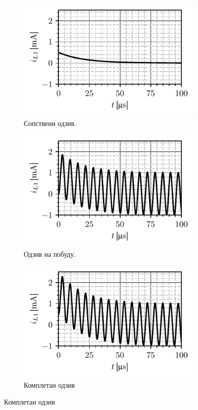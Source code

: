 \begin{figure}[b!]
    \hspace*{0pt}\hfill
    \begin{subfigure}[t]{0.45\textwidth}
        \centering
        \includegraphics[scale=1]{fig/vrste_rl_1.pdf}
        \caption{Сопствени одзив.}
    \end{subfigure}
    \hspace*{0pt}\hfill
    \begin{subfigure}[t]{0.45\textwidth}
        \centering
        \includegraphics[scale=1]{fig/vrste_rl_2.pdf}
        \caption{Одзив на побуду.}
    \end{subfigure}
    \hfill
    \hspace*{0pt}

    \hspace*{0pt}\hfill
    \begin{subfigure}[t]{0.45\textwidth}
        \centering
        \includegraphics[scale=1]{fig/vrste_rl_3.pdf}
        \caption{Комплетан одзив}
    \end{subfigure}
    \hfill
    \hspace*{0pt}


\end{figure}
